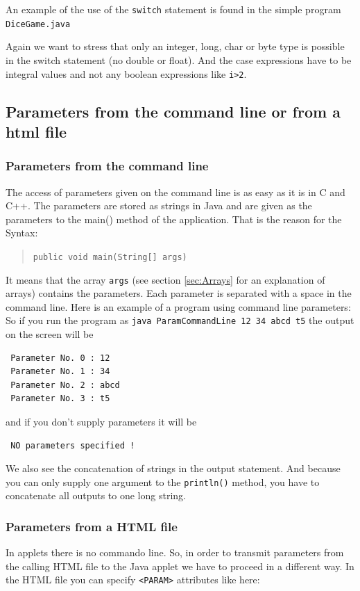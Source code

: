 An example of the use of the \verb|switch| statement is found in the
simple program \verb|DiceGame.java| 


Again we want to stress that only an integer, long, char or byte type
is possible in the switch statement (no double or float). And the
case expressions have to be integral values and not any boolean
expressions like \verb|i>2|. 

\subsection{Parameters from the command line or from a html file}
\label{sec:Parameter}

\subsubsection{Parameters from the command line}
The access of parameters given on the command line is as easy as it
is in C and C++. The parameters are stored as strings in Java and
are given as the parameters to the main() method of the application.
That is the reason for the Syntax:
\begin{quotation}
  \verb|public void main(String[] args) |
\end{quotation}
It means that the array \verb|args| (see section \ref{sec:Arrays}
for an explanation of arrays) contains the parameters. Each parameter
is separated with a space in the command line. Here is an example of a 
program using command line parameters:
So if you run the program as \verb|java ParamCommandLine 12 34 abcd t5|
the output on the screen will be
\begin{verbatim}
 Parameter No. 0 : 12
 Parameter No. 1 : 34
 Parameter No. 2 : abcd
 Parameter No. 3 : t5
\end{verbatim}
and if you don't supply parameters it will be
\begin{verbatim}
 NO parameters specified !
\end{verbatim}
We also see the concatenation of strings in the output statement.
And because you can only supply one argument to the  \verb|println()|
method, you have to concatenate all outputs to one long string.

\subsubsection{Parameters from a HTML file}
In applets there is no commando line. So, in order to transmit 
parameters from the calling HTML file to the Java applet we have to
proceed in a different way.
In the HTML file you can
specify \verb|<PARAM>| attributes like here:

